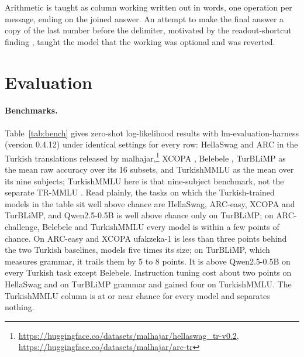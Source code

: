 \documentclass[11pt]{article}
\begin{document}
Arithmetic is taught as column working written out in words, one operation per message, ending on the joined answer. An attempt to make the final answer a copy of the last number before the delimiter, motivated by the readout-shortcut finding \cite{readout}, taught the model that the working was optional and was reverted.

\section{Evaluation}\label{sec:eval}
\paragraph{Benchmarks.} Table~\ref{tab:bench} gives zero-shot log-likelihood results with lm-evaluation-harness \cite{lmeval} (version 0.4.12) under identical settings for every row: HellaSwag \cite{hellaswag} and ARC \cite{arc} in the Turkish translations released by malhajar,\footnote{\url{https://huggingface.co/datasets/malhajar/hellaswag_tr-v0.2}, \url{https://huggingface.co/datasets/malhajar/arc-tr}} XCOPA \cite{xcopa}, Belebele \cite{belebele}, TurBLiMP \cite{turblimp} as the mean raw accuracy over its 16 subsets, and TurkishMMLU \cite{turkishmmlu} as the mean over its nine subjects; TurkishMMLU here is that nine-subject benchmark, not the separate TR-MMLU \cite{trmmlu}. Read plainly, the tasks on which the Turkish-trained models in the table sit well above chance are HellaSwag, ARC-easy, XCOPA and TurBLiMP, and Qwen2.5-0.5B \cite{qwen25} is well above chance only on TurBLiMP; on ARC-challenge, Belebele and TurkishMMLU every model is within a few points of chance. On ARC-easy and XCOPA ufakzeka-1 is less than three points behind the two Turkish baselines, models five times its size; on TurBLiMP, which measures grammar, it trails them by 5 to 8 points. It is above Qwen2.5-0.5B on every Turkish task except Belebele. Instruction tuning cost about two points on HellaSwag and on TurBLiMP grammar and gained four on TurkishMMLU. The TurkishMMLU column is at or near chance for every model and separates nothing.
\end{document}
